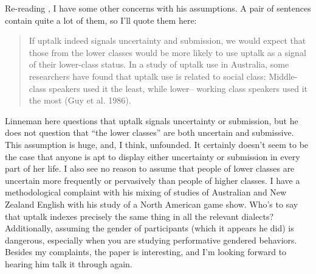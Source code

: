\documentclass[man,12pt]{apa6}
\begin{document}
Re-reading , I have some other concerns with his assumptions.
A pair of sentences contain quite a lot of them, so I'll quote them here:
\begin{quote} If uptalk indeed signals uncertainty and submission, we would
	expect that those from the lower classes would be more likely to use
	uptalk as a signal of their lower-class status. In a study of uptalk
	use in Australia, some researchers have found that uptalk use is
	related to social class: Middle-class speakers used it the least, while
lower– working class speakers used it the most (Guy et al. 1986).
\cite[p.~86]{Linneman13} \end{quote} Linneman here questions that uptalk
signals uncertainty or submission, but he does not question that ``the lower
classes'' are both uncertain and submissive.  This assumption is huge, and, I
think, unfounded. It certainly doesn't seem to be the case that anyone is apt
to display either uncertainty or submission in every part of her life. I also
see no reason to assume that people of lower classes are uncertain more
frequently or pervasively than people of higher classes. I have a
methodological complaint with his mixing of studies of Australian and New
Zealand English with his study of a North American game show. 
Who's to say that uptalk indexes precisely the same thing in all the relevant
dialects? Additionally, assuming the gender of participants (which it appears
he did) is dangerous, especially when you are studying performative gendered
behaviors. Besides my complaints, the paper is interesting, and I'm looking
forward to hearing him talk it through again.

\clearpage



\end{document}
